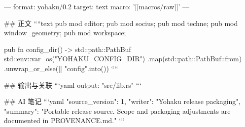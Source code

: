 ---
format: yohaku/0.2
target: text
macro: '[[macros/raw]]'
---

## 正文
````text
pub mod editor;
pub mod socius;
pub mod techne;
pub mod window_geometry;
pub mod workspace;

pub fn config_dir() -> std::path::PathBuf {
    std::env::var_os("YOHAKU_CONFIG_DIR")
        .map(std::path::PathBuf::from)
        .unwrap_or_else(|| "config".into())
}
````

## 输出与关联
```yaml
output: "src/lib.rs"
```

## AI 笔记
```yaml
{"source_version": 1, "writer": "Yohaku release packaging", "summary": "Portable release source. Scope and packaging adjustments are documented in PROVENANCE.md."}
```
